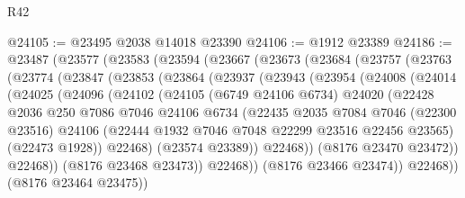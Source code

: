 \begin{lexlean}{R42}
\begin{coremodule}
{@24105 := @23495 @2038 @14018 @23390
@24106 := @1912 @23389
@24186 := @23487
    (@23577
      (@23583
        (@23594
          (@23667
            (@23673
              (@23684
                (@23757
                  (@23763
                    (@23774
                      (@23847
                        (@23853
                          (@23864
                            (@23937
                              (@23943
                                (@23954
                                  (@24008
                                    (@24014
                                      (@24025
                                        (@24096
                                          (@24102
                                            (@24105
                                              (@6749 @24106 @6734)
                                              @24020
                                              (@22428
                                                @2036
                                                @250
                                                @7086
                                                @7046
                                                @24106
                                                @6734
                                                (@22435
                                                  @2035
                                                  @7084
                                                  @7046
                                                  (@22300 @23516)
                                                  @24106
                                                  (@22444
                                                    @1932
                                                    @7046
                                                    @7048
                                                    @22299
                                                    @23516
                                                    @22456
                                                    @23565)
                                                  (@22473 @1928))
                                                @22468)
                                              (@23574 @23389))
                                            @22468))
                                        (@8176 @23470 @23472))
                                      @22468))
                                  (@8176 @23468 @23473))
                                @22468))
                            (@8176 @23466 @23474))
                          @22468))
                      (@8176 @23464 @23475))
}
\end{coremodule}
\end{lexlean}
